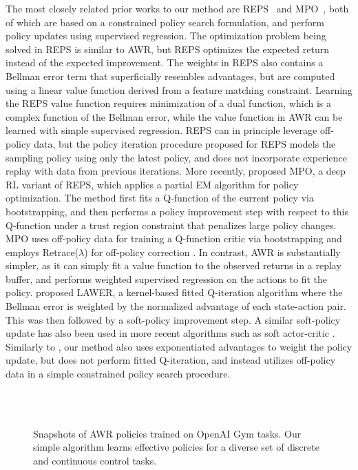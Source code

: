 \documentclass{article} \usepackage{iclr2020_conference,times}
\begin{document}
The most closely related prior works to our method are REPS~\citep{Peters2010REP} and MPO~\citep{abdolmaleki2018maximum}, both of which are based on a constrained policy search formulation, and perform policy updates using supervised regression. 
The optimization problem being solved in REPS is similar to AWR, but REPS optimizes the expected return instead of the expected improvement. The weights in REPS also contains a Bellman error term that superficially resembles advantages, but are computed using a linear value function derived from a feature matching constraint. Learning the REPS value function requires minimization of a dual function, which is a complex function of the Bellman error, while the value function in AWR can be learned with simple supervised regression. REPS can in principle leverage off-policy data, but the policy iteration procedure proposed for REPS models the sampling policy using only the latest policy, and does not incorporate experience replay with data from previous iterations.
More recently, \citet{abdolmaleki2018maximum} proposed MPO, a deep RL variant of REPS, which applies a partial EM algorithm for policy optimization. The method first fits a Q-function of the current policy via bootstrapping, and then performs a policy improvement step with respect to this Q-function under a trust region constraint that penalizes large policy changes. MPO uses off-policy data for training a Q-function critic via bootstrapping and employs Retrace($\lambda$) for off-policy correction \citep{Munos2016}. In contrast, AWR is substantially simpler, as it can simply fit a value function to the observed returns in a replay buffer, and performs weighted supervised regression on the actions to fit the policy.
\citet{Neumann2009Gerhard} proposed LAWER, a kernel-based fitted Q-iteration algorithm where the Bellman error is weighted by the normalized advantage of each state-action pair. This was then followed by a soft-policy improvement step. A similar soft-policy update has also been used in more recent algorithms such as soft actor-critic \citep{haarnoja18b}. Similarly to \citep{Neumann2009Gerhard}, our method also uses exponentiated advantages to weight the policy update, but does not perform fitted Q-iteration, and instead utilizes off-policy data in a simple constrained policy search procedure.

\begin{figure}[t!]
	\centering
    \\
    \vspace{-0.25cm}
    \\
    \vspace{-0.25cm}
\caption{Snapshots of AWR policies trained on OpenAI Gym tasks. Our simple algorithm learns effective policies for a diverse set of discrete and continuous control tasks.}
\label{fig:filmstripsGym}
\end{figure}
\end{document}
